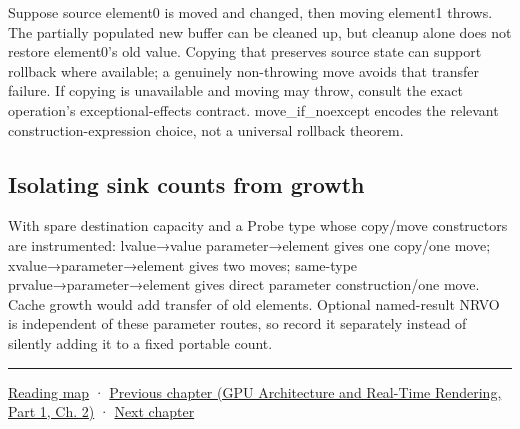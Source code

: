 \hypertarget{01-foundations-i-ch010-why-no-throw-properties-matter-to-growth}{}

Suppose source element0 is moved and changed, then moving element1 throws. The partially populated new buffer can be cleaned up, but cleanup alone does not restore element0's old value. Copying that preserves source state can support rollback where available; a genuinely non-throwing move avoids that transfer failure. If copying is unavailable and moving may throw, consult the exact operation's exceptional-effects contract. move\_if\_noexcept encodes the relevant construction-expression choice, not a universal rollback theorem.

\subsection{Isolating sink counts from growth}\label{01-foundations-i-ch010-isolating-sink-counts-from-growth}

\hypertarget{01-foundations-i-ch010-isolating-sink-counts-from-growth}{}

With spare destination capacity and a Probe type whose copy/move constructors are instrumented: lvalue→value parameter→element gives one copy/one move; xvalue→parameter→element gives two moves; same-type prvalue→parameter→element gives direct parameter construction/one move. Cache growth would add transfer of old elements. Optional named-result NRVO is independent of these parameter routes, so record it separately instead of silently adding it to a fixed portable count.

\begin{center}\rule{0.5\linewidth}{0.5pt}\end{center}

\hyperref[volume-reading-map]{Reading map} · \href{../06-GPU-Architecture-and-Real-Time-Rendering-P01/main.pdf\#nameddest=01-foundations-i-ch009-gpu-memory-divergence-atomics-and-ordering}{Previous chapter (GPU Architecture and Real-Time Rendering, Part 1, Ch. 2)} · \hyperref[01-foundations-i-ch011-c-const-borrowing-and-cpugpu-buffering]{Next chapter}
